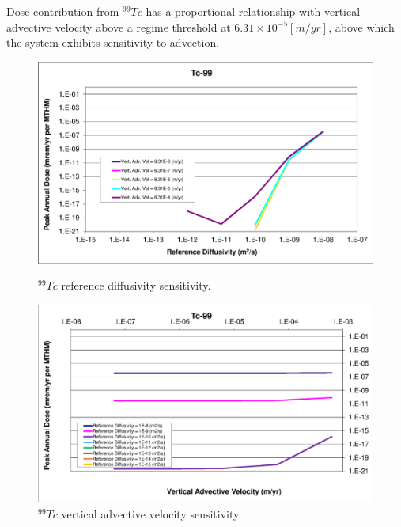 Dose contribution from $^{99}Tc$ has a proportional 
relationship with vertical advective velocity above a regime threshold at 
$6.31\times10^{-5}[m/yr]$, above which the system exhibits sensitivity to 
advection. 


\begin{figure}[htp!]
\begin{minipage}[b]{0.45\linewidth}
\includegraphics[width=\linewidth]{./chapters/nuclide_sensitivity/clay/AdvVelAndDiffCoeffEBSFail/Tc-99.eps}
\caption{$^{99}Tc$ reference diffusivity sensitivity.}
\label{fig:VAdvVelTc99}

\end{minipage}
\hspace{0.05\linewidth}
\begin{minipage}[b]{0.45\linewidth}

\includegraphics[width=\linewidth]{./chapters/nuclide_sensitivity/clay/AdvVelAndDiffCoeffEBSFail/Tc-99-VAdvVel.eps}
\caption{$^{99}Tc$ vertical advective velocity sensitivity.}
\label{fig:VAdvVelTc99VAdvVel}

\end{minipage}
\end{figure}

